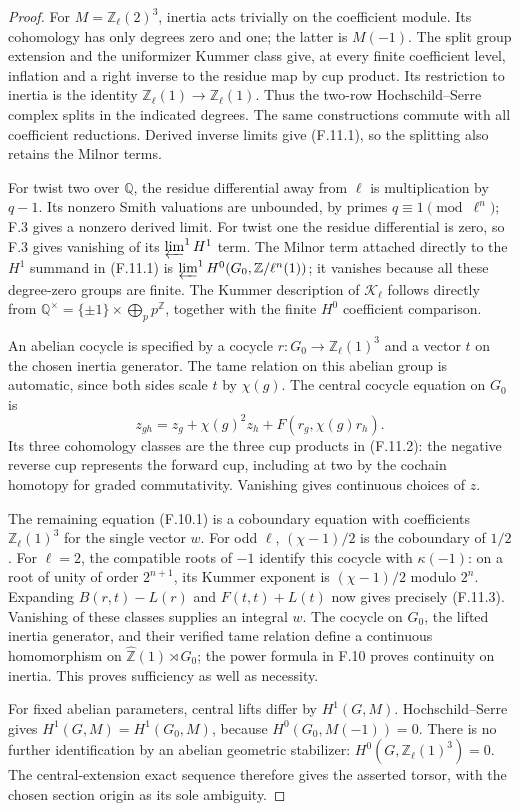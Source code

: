 \begin{proof}
For $M=\mathbb Z_\ell(2)^3$, inertia acts trivially on the coefficient
module. Its cohomology has only degrees zero and one; the latter
is $M(-1)$. The split group extension and the uniformizer Kummer
class give, at every finite coefficient level, inflation and a
right inverse to the residue map by cup product. Its restriction
to inertia is the identity $\mathbb Z_\ell(1)\to\mathbb Z_\ell(1)$.
Thus the two-row Hochschild--Serre complex splits in the indicated
degrees. The same constructions commute with all coefficient
reductions. Derived inverse limits give (F.11.1), so the splitting
also retains the Milnor terms.

For twist two over $\mathbb Q$, the residue differential away from
$\ell$ is multiplication by $q-1$. Its nonzero Smith valuations
are unbounded, by primes $q\equiv1\pmod{\ell^n}$; F.3 gives a
nonzero derived limit. For twist one the residue differential is
zero, so F.3 gives vanishing of its $\varprojlim^1 H^1$ term.
The Milnor term attached directly to the $H^1$ summand in
(F.11.1) is $\varprojlim^1 H^0(G_0,\mathbb Z/\ell^n(1))$;
it vanishes because all these degree-zero groups are finite.
The Kummer description of
$\mathscr K_\ell$ follows directly from
$\mathbb Q^\times=\{\pm1\}\times\bigoplus_p p^{\mathbb Z}$,
together with the finite $H^0$ coefficient comparison.

An abelian cocycle is specified by a cocycle
$r:G_0\to\mathbb Z_\ell(1)^3$ and a vector $t$ on the chosen
inertia generator. The tame relation on this abelian group is
automatic, since both sides scale $t$ by $\chi(g)$.
The central cocycle equation on $G_0$ is
\[
 z_{gh}=z_g+\chi(g)^2z_h+F(r_g,\chi(g)r_h).
\]
Its three cohomology classes are the three cup products in
(F.11.2): the negative reverse cup represents the forward cup,
including at two by the cochain homotopy for graded commutativity.
Vanishing gives continuous choices of $z$.

The remaining equation (F.10.1) is a coboundary equation with
coefficients $\mathbb Z_\ell(1)^3$ for the single vector $w$.
For odd $\ell$, $(\chi-1)/2$ is the coboundary of $1/2$.
For $\ell=2$, the compatible roots of $-1$ identify this cocycle
with $\kappa(-1)$: on a root of unity of order $2^{n+1}$,
its Kummer exponent is $(\chi-1)/2$ modulo $2^n$.
Expanding $B(r,t)-L(r)$ and $F(t,t)+L(t)$ now gives precisely
(F.11.3). Vanishing of these classes supplies an integral $w$.
The cocycle on $G_0$, the lifted inertia generator, and their
verified tame relation define a continuous homomorphism on
$\widehat{\mathbb Z}(1)\rtimes G_0$; the power formula in F.10
proves continuity on inertia. This proves sufficiency as well
as necessity.

For fixed abelian parameters, central lifts differ by
$H^1(G,M)$. Hochschild--Serre gives
$H^1(G,M)=H^1(G_0,M)$, because
$H^0(G_0,M(-1))=0$. There is no further identification by an
abelian geometric stabilizer: $H^0(G,\mathbb Z_\ell(1)^3)=0$.
The central-extension exact sequence therefore gives the asserted
torsor, with the chosen section origin as its sole ambiguity.
\end{proof}

